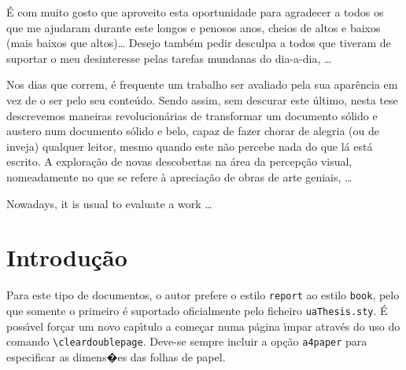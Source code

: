 \documentclass[11pt,twoside,a4paper]{report}
\begin{document}
\TitlePage
  \vspace*{55mm}
       {\'E com muito gosto que aproveito esta oportunidade para agradecer a todos os que me
        ajudaram durante este longos e penosos anos, cheios de altos e baixos (mais baixos que
        altos)\ldots}
  \TEXT{}
       {Desejo tamb\'em pedir desculpa a todos que tiveram de suportar o meu desinteresse pelas
        tarefas mundanas do dia-a-dia, \ldots}
\EndTitlePage
\titlepage\ \endtitlepage %

\TitlePage
  \vspace*{55mm}
       {Nos dias que correm, \'e frequente um trabalho ser avaliado pela sua apar\^encia em vez de
        o ser pelo seu conte\'udo. Sendo assim, sem descurar este \'ultimo, nesta tese descrevemos
        maneiras revolucion\'arias de transformar um documento s\'olido e austero num documento
        s\'olido e belo, capaz de fazer chorar de alegria (ou de inveja) qualquer leitor, mesmo
        quando este n\~ao percebe nada do que l\'a est\'a escrito.}
  \TEXT{}
       {A explora\c c\~ao de novas descobertas na \'area da percep\c c\~ao visual, nomeadamente
        no que se refere \`a aprecia\c c\~ao de obras de arte geniais, \ldots}
\EndTitlePage
\titlepage\ \endtitlepage %

\TitlePage
  \vspace*{55mm}
       {Nowadays, it is usual to evaluate a work \ldots}
\EndTitlePage
\titlepage\ \endtitlepage %


%
%

\tableofcontents

\cleardoublepage
\listoffigures

\cleardoublepage
\listoftables



\cleardoublepage
{}
\chapter{Introdu\c c\~ao}

Para este tipo de documentos, o autor prefere o estilo \verb+report+ ao estilo \verb-book-,
pelo que somente o primeiro \'e suportado oficialmente pelo ficheiro \verb:uaThesis.sty:.
\'E poss\'\i vel for\c car um novo cap\'\i tulo a come\c car numa p\'agina \'\i mpar atrav\'es
do uso do comando \verb!\cleardoublepage!. Deve-se sempre incluir a op\c c\~ao \verb+a4paper+
para especificar as dimens�es das folhas de papel.
\end{document}
